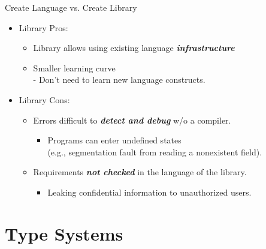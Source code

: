 \documentclass{beamer}
\renewcommand{\emph}[1]{\textbf{\textit{#1}}}
\begin{document}
\begin{frame}{Create Language vs. Create Library}
\begin{itemize}
\pause
\item Library Pros:
	\begin{itemize}
	\item Library allows using existing language \emph{infrastructure}

\pause
	\item Smaller learning curve \\
	- Don't need to learn new language constructs.
	\end{itemize}

\pause
\item Library Cons:
  \begin{itemize}
  \item Errors difficult to \emph{detect and debug} w/o a compiler.
		\begin{itemize}
		\item Programs can enter undefined states \\
		(e.g., segmentation fault from reading a nonexistent field).
		\end{itemize}

\pause
	\item Requirements \emph{not checked} in the language of the library.
		\begin{itemize}
		\item Leaking confidential information to unauthorized users.
		\end{itemize}
  \end{itemize}
\end{itemize}
\end{frame}

\section{Type Systems}
\end{document}
